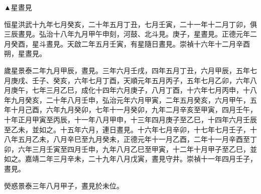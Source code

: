 \begin{pinyinscope}
▲星晝見

恒星洪武十九年七月癸亥，二十年五月丁丑，七月壬寅，二十一年十二月丁卯，俱三辰晝見。弘治十八年九月甲午申刻，河鼓、北斗見。庚子，星晝見。正德元年二月癸酉，星斗晝見。天啟二年五月壬寅，有星隨日晝見。崇禎十六年十二月辛酉朔，星晝見。

歲星景泰二年九月甲辰，晝見。三年六月壬戌，四年五月丁丑，六月甲辰，五年七月庚戌、壬子、癸亥，六年七月丁酉，天順元年五月丙子，五年七月乙卯，六年八月庚午，七年三月乙巳，成化十四年六月庚子，八月丁酉，十六年七月丙申，十八年九月癸亥，二十年八月壬申，弘治元年六月甲寅，二年五月癸亥，六月甲午，五年十月己酉，六年九月癸卯，七年十一月癸卯，九年二月辛亥至甲寅，四月壬午，十年正月甲寅至丙辰，十一年八月甲申，十三年四月庚子至乙巳，十四年六月壬辰至乙未，並如之。十五年六月，連日晝見。十六年七月辛卯，十七年七月壬子，十八年五月乙未，八月辛巳至九月癸未，正德元年十一月乙酉，二年十一月辛酉至丁卯，六年三月壬寅至四月壬申，九年八月乙巳至甲寅，十二年十月甲子至乙巳，並如之。嘉靖二年三月辛未，二十九年八月戊寅，晝見守井。崇禎十一年四月壬子，晝見。

熒惑景泰三年八月甲子，晝見於未位。


\end{pinyinscope}
